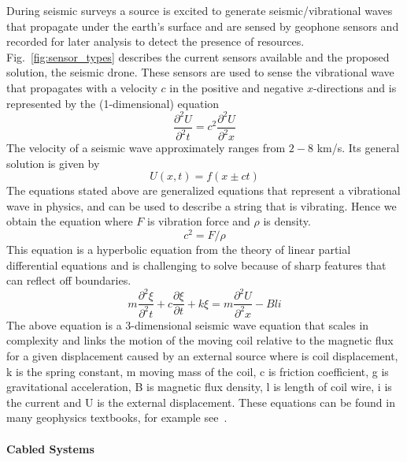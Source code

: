 During seismic surveys a source is excited to generate seismic/vibrational waves that propagate under the earth's surface and are sensed by geophone sensors and recorded for later analysis to detect the presence of resources. Fig.~\ref{fig:sensor_types} describes the current sensors available and the proposed solution, the seismic drone. These sensors are used to sense the vibrational wave that propagates with a velocity $c$ in the positive and negative $x$-directions and is represented by the (1-dimensional) equation
\begin{equation}
\frac{\partial^{2}{U}}{\partial^{2}{t}} = {c}^{2}\frac{\partial^{2}{U}}{\partial^{2}{x}}
\end{equation}
The velocity of a seismic wave approximately ranges from $2-8$ km/s.
Its general solution is given by
\begin{equation}
U(x,t) = f(x \pm ct)
\end{equation}
The equations stated above are generalized equations that represent a vibrational wave in physics, and can be used to describe a string that is vibrating. Hence we obtain the equation where $F$ is vibration force and $\rho$ is density.
\begin{equation}
{c}^{2} = F/\rho
\end{equation}
This equation is a hyperbolic equation from the theory of linear partial differential equations and is challenging to solve because of sharp features that can reflect off boundaries.
\begin{equation}
m\frac{\partial^{2}{\xi}}{\partial^{2}{t}}+c\frac{\partial{\xi}}{\partial{t}}+k\xi = m\frac{\partial^{2}{U}}{\partial^{2}{x}}-Bli
\end{equation} 
The above equation is a $3$-dimensional seismic wave equation that scales in complexity and links the motion of the moving coil relative to the magnetic flux for a given displacement caused by an external source where \xi is coil displacement, k is the spring constant, m moving mass of the coil, c is friction coefficient, g is gravitational acceleration, B is magnetic flux density, l is length of coil wire, i is the current and U is the external displacement. These equations can be found in many geophysics textbooks, for example see~\cite{shearer2009introduction}.

 \paragraph{Cabled Systems}

